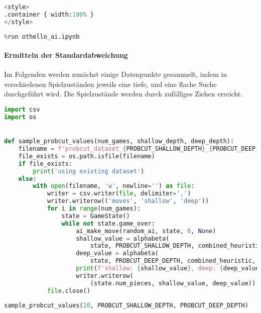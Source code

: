 \begin{lstlisting}[language=Python]
%%HTML
<style>
.container { width:100% }
</style>
\end{lstlisting}

\begin{lstlisting}[language=Python]
%run othello_game.ipynb
%run othello_ai.ipynb
\end{lstlisting}

\hypertarget{ermitteln-der-standardabweichung}{%
\paragraph{Ermitteln der
Standardabweichung}\label{ermitteln-der-standardabweichung}}

Im Folgenden werden zunächst einige Datenpunkte gesammelt, indem in
verschiedenen Spielzuständen jeweils eine tiefe, und eine flache Suche
durchgeführt wird. Die Spielzustände werden durch zufälliges Ziehen
erreicht.

\begin{lstlisting}[language=Python]
import csv
import os


def sample_probcut_values(num_games, shallow_depth, deep_depth):
    filename = f'probcut_dataset_{PROBCUT_SHALLOW_DEPTH}_{PROBCUT_DEEP_DEPTH}.csv'
    file_exists = os.path.isfile(filename)
    if file_exists:
        print('using existing dataset')
    else:
        with open(filename, 'w', newline='') as file:
            writer = csv.writer(file, delimiter=',')
            writer.writerow(('moves', 'shallow', 'deep'))
            for i in range(num_games):
                state = GameState()
                while not state.game_over:
                    ai_make_move(random_ai, state, 0, None)
                    shallow_value = alphabeta(
                        state, PROBCUT_SHALLOW_DEPTH, combined_heuristic, -math.inf, math.inf)
                    deep_value = alphabeta(
                        state, PROBCUT_DEEP_DEPTH, combined_heuristic, -math.inf, math.inf)
                    print(f'shallow: {shallow_value}, deep: {deep_value}')
                    writer.writerow(
                        (state.num_pieces, shallow_value, deep_value))
            file.close()
\end{lstlisting}

\begin{lstlisting}[language=Python]
sample_probcut_values(20, PROBCUT_SHALLOW_DEPTH, PROBCUT_DEEP_DEPTH)
\end{lstlisting}

